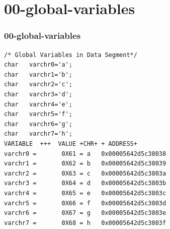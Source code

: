 \documentclass[aspectratio=169, xcolor=table, notheorems, hyperref={pdfpagelabels=false}]{beamer}
\begin{document}
\section{00-global-variables}
\begin{frame}[fragile]
\frametitle{00-global-variables}
\begin{lstlisting}[basicstyle=\ttfamily\tiny]
/* Global Variables in Data Segment*/
char   varchr0='a';
char   varchr1='b';
char   varchr2='c';
char   varchr3='d';
char   varchr4='e';
char   varchr5='f';
char   varchr6='g';
char   varchr7='h';
VARIABLE  +++  VALUE +CHR+ + ADDRESS+
varchr0 =       0X61 = a   0x00005642d5c38038
varchr1 =       0X62 = b   0x00005642d5c38039
varchr2 =       0X63 = c   0x00005642d5c3803a
varchr3 =       0X64 = d   0x00005642d5c3803b
varchr4 =       0X65 = e   0x00005642d5c3803c
varchr5 =       0X66 = f   0x00005642d5c3803d
varchr6 =       0X67 = g   0x00005642d5c3803e
varchr7 =       0X68 = h   0x00005642d5c3803f
\end{lstlisting}

\begin{minipage}[t]{120mm}
\end{minipage}

\end{frame}

\end{document}
